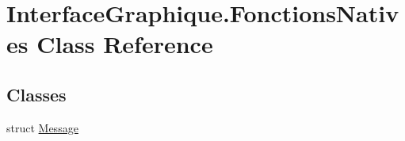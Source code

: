 \hypertarget{class_interface_graphique_1_1_fonctions_natives}{}\section{Interface\+Graphique.\+Fonctions\+Natives Class Reference}
\label{class_interface_graphique_1_1_fonctions_natives}
\subsection*{Classes}
\begin{DoxyCompactItemize}
\item 
struct \hyperlink{struct_interface_graphique_1_1_fonctions_natives_1_1_message}{Message}
\end{DoxyCompactItemize}
